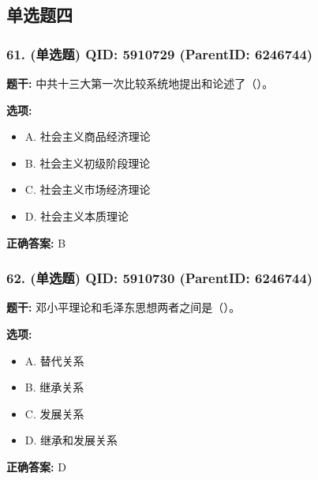 \documentclass[12pt,UTF8]{ctexart}
\begin{document}
\subsection*{单选题四}

\subsubsection*{61. (单选题) \small QID: 5910729 (ParentID: 6246744)}

\textbf{题干:}
中共十三大第一次比较系统地提出和论述了（）。



\textbf{选项:}
\begin{itemize}[leftmargin=*]

  \item A. 社会主义商品经济理论

  \item B. 社会主义初级阶段理论

  \item C. 社会主义市场经济理论

  \item D. 社会主义本质理论

\end{itemize}

\textbf{正确答案:}
B

\vspace{0.3em}\hrulefill\vspace{0.7em}

\subsubsection*{62. (单选题) \small QID: 5910730 (ParentID: 6246744)}

\textbf{题干:}
邓小平理论和毛泽东思想两者之间是（）。



\textbf{选项:}
\begin{itemize}[leftmargin=*]

  \item A. 替代关系

  \item B. 继承关系

  \item C. 发展关系

  \item D. 继承和发展关系

\end{itemize}

\textbf{正确答案:}
D
\end{document}
